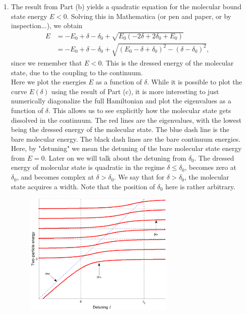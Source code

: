 \documentclass{article}
\theoremstyle{definition}
\begin{document}
\begin{enumerate}[label=(\alph*)]
\item The result from Part (b) yields a quadratic equation for the molecular bound state energy $E<0$. Solving this in Mathematica (or pen and paper, or by inspection...), we obtain 
\begin{align*}
E 
&= -E_0 + \delta - \delta_0 + \sqrt{E_0(-2\delta + 2\delta_0 + E_0)} \\ 
&= -E_0 + \delta - \delta_0 + \sqrt{(E_0 - \delta + \delta_0)^2 - (\delta - \delta_0)^2},
\end{align*}
since we remember that $E<0$. This is the dressed energy of the molecular state, due to the coupling to the continuum. \\


Here we plot the energies $E$ as a function of $\delta$. While it is possible to plot the curve $E(\delta)$ using the result of Part (c), it is more interesting to just numerically diagonalize the full Hamiltonian and plot the eigenvalues as a function of $\delta$. This allows us to see explicitly how the molecular state gets dissolved in the continuum. The red lines are the eigenvalues, with the lowest being the dressed energy of the molecular state. The blue dash line is the bare molecular energy. The black dash lines are the bare continuum energies. Here, by "detuning" we mean the detuning of the bare molecular state energy from $E=0$. Later on we will talk about the detuning from $\delta_0$. The dressed energy of molecular state is quadratic in the regime $\delta \leq \delta_0$, becomes zero at $\delta_0$, and becomes complex at $\delta > \delta_0$. We say that for $\delta > \delta_0$, the molecular state acquires a width. Note that the position of $\delta_0$ here is rather arbitrary.


\begin{figure}[!htb]
\centering
\includegraphics[width=0.7\textwidth]{Feshbach_resonance_new.eps}
\end{figure}





\end{enumerate}
\end{document}
